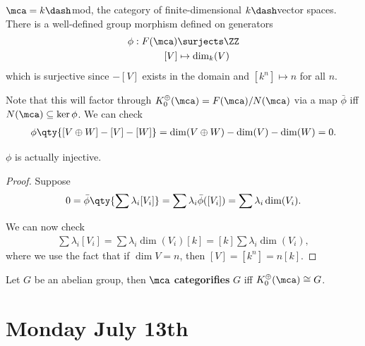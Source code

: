 \begin{example}

\(\mca = k\dash\)mod, the category of finite-dimensional
\(k\dash\)vector spaces. There is a well-defined group morphism defined
on generators
\begin{align*}
\phi: F(\mca) &\surjects \ZZ \\
[V] &\mapsto \dim_k(V)
\end{align*} which is surjective since \(-[V]\) exists in the domain and
\([k^n] \mapsto n\) for all \(n\).

Note that this will factor through
\(K_0^\oplus(\mca) = F(\mca)/ N(\mca)\) via a map \(\bar\phi\) iff
\(N(\mca) \subseteq \ker \phi\). We can check
\begin{align*}
\phi\qty{[V\oplus W] - [V] - [W] } 
= \dim(V\oplus W) - \dim(V) - \dim(W) = 0
.\end{align*}

\begin{claim}

\(\phi\) is actually injective.

\end{claim}

\begin{proof}

Suppose
\begin{align*}
0 = \bar\phi\qty{ \sum \lambda_i [V_i]} = \sum \lambda_i \bar \phi([V_i]) = \sum \lambda_i \dim(V_i)
.\end{align*}

We can now check
\begin{align*}
\sum \lambda_i [V_i] = \sum \lambda_i \dim(V_i) [k] = [k] \sum \lambda_i \dim(V_i)
,\end{align*} where we use the fact that if \(\dim V = n\), then
\([V] = [k^n] = n[k]\).

\end{proof}

\end{example}

\begin{definition}[Categorification]

Let \(G\) be an abelian group, then \(\mca\) \textbf{categorifies} \(G\)
iff \(K_0^\oplus(\mca) \cong G\).

\end{definition}

\hypertarget{monday-july-13th}{%
\section{Monday July 13th}\label{monday-july-13th}}

